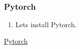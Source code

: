 \documentclass[12pt]{article}
\begin{document}
\subsubsection{Pytorch}

\begin{enumerate}[resume]
  \item Lets install Pytorch.
\end{enumerate}

\begin{center}
\href{run:./Text_Files_14/Pytorch.txt}{\Large Pytorch}
\end{center}





%
%
\end{document}
